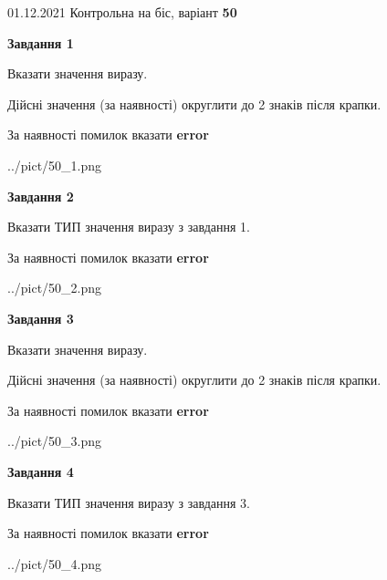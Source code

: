 \documentclass[11pt, ukrainian]{article}
\begin{document}
{01.12.2021 Контрольна на біс, варіант  \No \textbf { 50 }\par}
{
\begin {large}
{\begin {center}\textbf{Завдання 1}\end {center}}\par
Вказати значення виразу. \par
Дійсні значення (за наявності) округлити до 2 знаків після крапки. \par
За наявності помилок вказати \textbf{error}

\begin{center}
	{../pict/50_1.png}
\end{center}
\newpage

{\begin {center}\textbf{Завдання 2}\end {center}}\par
Вказати ТИП значення виразу з завдання 1. \par
За наявності помилок вказати \textbf{error}

\begin{center}
	{../pict/50_2.png}
\end{center}
\newpage

{\begin {center}\textbf{Завдання 3}\end {center}}\par
Вказати значення виразу. \par
Дійсні значення (за наявності) округлити до 2 знаків після крапки. \par
За наявності помилок вказати \textbf{error}

\begin{center}
	{../pict/50_3.png}
\end{center}
\newpage

{\begin {center}\textbf{Завдання 4}\end {center}}\par
Вказати ТИП значення виразу з завдання 3. \par
За наявності помилок вказати \textbf{error}

\begin{center}
	{../pict/50_4.png}
\end{center}
\newpage


\end{large}}
\end{document}
